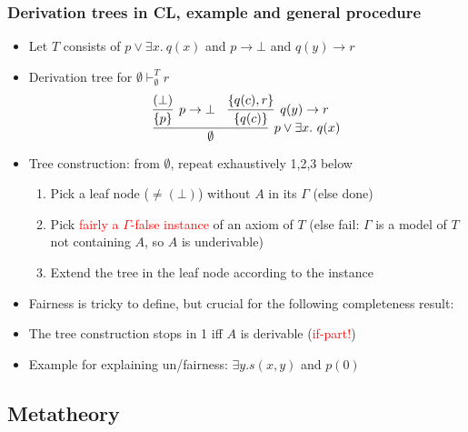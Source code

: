 \documentclass[handout,11pt]{beamer}
\newcommand{\red}[1]{\textcolor{red}{#1}}
\newcommand{\set}[1]{\{#1\}}
\begin{document}
\begin{frame}\label{proofsearch}
\frametitle{Derivation trees in CL, example and general procedure}
 \begin{itemize}[<+->]   %
    \item Let $T$ consists of $p\lor \exists x.~q(x)$ 
    and $p\to\bot$ and $q(y)\to r$
    \item Derivation tree for $\emptyset\vdash_{\emptyset}^T r$
    \[
\infer[p\vee \exists x.~q(x)]{\emptyset}
{
\infer[p\to\bot]{\set{p}}{(\bot)} & \infer[q(y)\to r]{\set{q(c)}}{\set{q(c),r}}
}
\]
    \item Tree construction: from $\emptyset$, repeat exhaustively 1,2,3 below
    \begin{enumerate}
    \item Pick a leaf node (${}\neq(\bot)$) without $A$ in its $\Gamma$ 
    (else done)
    \item Pick \red{fairly a $\Gamma$-false  instance} of an axiom of $T$
    (else fail: $\Gamma$ is a model of $T$ not containing $A$, 
    so $A$ is underivable)
    \item Extend the tree in the leaf node according to the instance  
    \end{enumerate}
    \item Fairness is tricky to define, but crucial for the following
    completeness result:
    \item The tree construction stops in 1 iff $A$ is derivable (\red{if-part!})
    \item Example for explaining un/fairness: $\exists y. s(x,y)$ and $p(0)$
 \end{itemize}
\end{frame}

\subsection{Metatheory}
\end{document}
